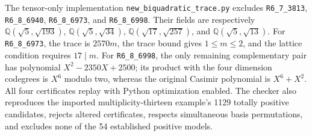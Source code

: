 The tensor-only implementation \texttt{new\_biquadratic\_trace.py} excludes
\texttt{R6\_7\_3813}, \texttt{R6\_8\_6940}, \texttt{R6\_8\_6973}, and
\texttt{R6\_8\_6998}.  Their fields are respectively
$\mathbb Q(\sqrt5,\sqrt{193})$,
$\mathbb Q(\sqrt5,\sqrt{34})$,
$\mathbb Q(\sqrt{17},\sqrt{257})$, and
$\mathbb Q(\sqrt5,\sqrt{13})$.
For \texttt{R6\_8\_6973}, the trace is $2570m$, the trace bound gives
$1\le m\le2$, and the lattice condition requires $17\mid m$.
For \texttt{R6\_8\_6998}, the only remaining complementary pair has polynomial
$X^2-2350X+2500$; its product with the four dimension codegrees is
$X^6$ modulo two, whereas the original Casimir polynomial is $X^6+X^2$.
All four certificates replay with Python optimization enabled.  The checker
also reproduces the imported multiplicity-thirteen example's 1129 totally
positive candidates, rejects altered certificates, respects simultaneous
basis permutations, and excludes none of the 54 established positive models.
